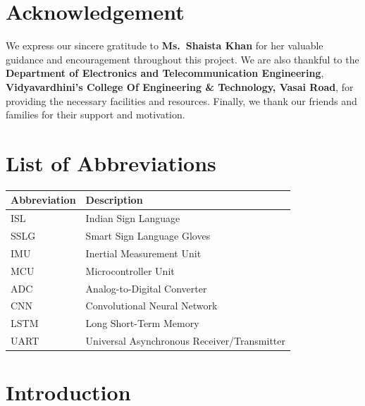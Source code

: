 \documentclass[12pt,a4paper]{report}
\newcommand{\InstituteName}{Vidyavardhini's College Of Engineering \& Technology, Vasai Road}
\newcommand{\DeptName}{Department of Electronics and Telecommunication Engineering}
\newcommand{\GuideName}{Ms.\ Shaista Khan}
\begin{document}
\cleardoublepage

\chapter*{Acknowledgement}
We express our sincere gratitude to \textbf{\GuideName} for her valuable
guidance and encouragement throughout this project. We are also thankful to the
\textbf{\DeptName}, \textbf{\InstituteName}, for providing the necessary
facilities and resources. Finally, we thank our friends and families for their
support and motivation.

\cleardoublepage

\tableofcontents
\listoffigures
{}
\listoftables
{}
\cleardoublepage

\chapter*{List of Abbreviations}
\begin{tabularx}{\textwidth}{@{}lX@{}}
\toprule
\textbf{Abbreviation} & \textbf{Description} \\
\midrule
ISL & Indian Sign Language \\
SSLG & Smart Sign Language Gloves \\
IMU & Inertial Measurement Unit \\
MCU & Microcontroller Unit \\
ADC & Analog-to-Digital Converter \\
CNN & Convolutional Neural Network \\
LSTM & Long Short-Term Memory \\
UART & Universal Asynchronous Receiver/Transmitter \\
\bottomrule
\end{tabularx}
\cleardoublepage
{}
\setcounter{page}{1}

\chapter{Introduction}
\end{document}
